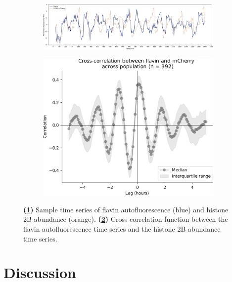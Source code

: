 \begin{figure}
  \centering
  \begin{subfigure}[t]{1.0\textwidth}
  \centering
    \includegraphics[width=\linewidth]{single_birth_plot_nostar.pdf}
    \caption{
    }
    \label{fig:xcf-biol-ts}
  \end{subfigure}

  \begin{subfigure}[t]{0.7\textwidth}
  \centering
    \includegraphics[width=\linewidth]{xcf_edit.pdf}
    \caption{
    }
    \label{fig:xcf-biol-xcf}
  \end{subfigure}

  \caption[
    Sample time series of flavin autofluorescence and histone 2B abundance, along with the cross-correlation function.
  ]{
    \textbf{(\ref{fig:xcf-biol-ts})}
    Sample time series of flavin autofluorescence (blue) and histone 2B abundance (orange).
    \textbf{(\ref{fig:xcf-biol-xcf})}
    Cross-correlation function between the flavin autofluorescence time series and the histone 2B abundance time series.
  }
  \label{fig:xcf-biol}
\end{figure}


\section{Discussion}
\label{sec:analysis-discussion}

